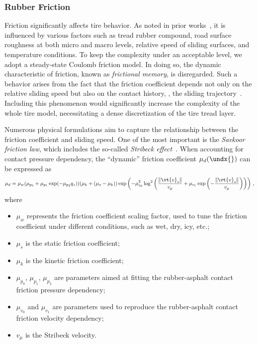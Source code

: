 
\subsubsection{Rubber Friction}
\label{app3:sec:rubber_friction}

Friction significantly affects tire behavior. As noted in prior works~\cite{selig2014rubber, savkoor1965friction, savkoor1987dry, tiwari2017rubber}, it is influenced by various factors such as tread rubber compound, road surface roughness at both micro and macro levels, relative speed of sliding surfaces, and temperature conditions. To keep the complexity under an acceptable level, we adopt a steady-state Coulomb friction model. In doing so, the dynamic characteristic of friction,  known as \emph{frictional memory}, is disregarded. Such a behavior arises from the fact that the friction coefficient depends not only on the relative sliding speed but also on the contact history, \ie{}, the sliding trajectory~\cite{persson2010rubber}. Including this phenomenon would significantly increase the complexity of the whole tire model, necessitating a dense discretization of the tire tread layer.

Numerous physical formulations aim to capture the relationship between the friction coefficient and sliding speed. One of the most important is the \emph{Savkoor friction law}, which includes the so-called \emph{Stribeck effect}~\cite{savkoor1965friction, savkoor1966some, savkoor1987dry}. When accounting for contact pressure dependency, the ``dynamic'' friction coefficient $\mu_d(\undx{})$ can be expressed as
%
\begin{equation}
  \mu_d = \mu_w (\mu_{p_0} + \mu_{p_1} \exp( -\mu_{p_2} q_z )) (\mu_k + (\mu_s - \mu_k)) \exp\left( -\mu_{v_0}^2 \log^2 \left( \dfrac{\|\vt{v}_s\|}{v_\mu} + \mu_{v_1} \exp\left(-\dfrac{\|\vt{v}_s\|}{v_\mu}\right)\right)\right) \, \text{,}
\end{equation}
%
where
%
\begin{itemize}
  \setlength{\itemsep}{0pt}
  \item $\mu_w$ represents the friction coefficient scaling factor, used to tune the friction coefficient under different conditions, such as wet, dry, icy, etc.;
  \item $\mu_s$ is the static friction coefficient;
  \item $\mu_k$ is the kinetic friction coefficient;
  \item $\mu_{p_0}$, $\mu_{p_1}$, $\mu_{p_2}$ are parameters aimed at fitting the rubber-asphalt contact friction pressure dependency;
  \item $\mu_{v_0}$ and $\mu_{v_1}$ are parameters used to reproduce the rubber-asphalt contact friction velocity dependency;
  \item $v_\mu$ is the Stribeck velocity.
\end{itemize}

